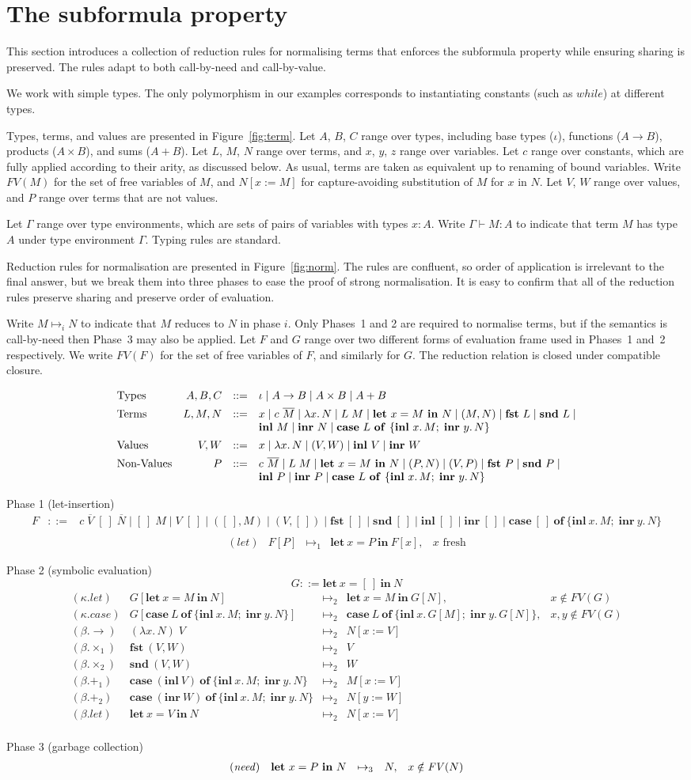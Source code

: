\documentclass[authoryear,9pt]{sigplanconf}
\makeatletter
\newcommand{\one}{\mathbf{1}}
\newcommand{\arrow}[2]{#1\rightarrow#2}
\newcommand{\product}[2]{#1\times#2}
\newcommand{\coproduct}[2]{#1+#2}
\newcommand{\key}{\mathbf}
\newcommand{\app}{\;}
\newcommand{\expvar}[1]{#1}
\newcommand{\expconst}[2]{#1~#2}
\newcommand{\expunit}{()}
\newcommand{\expabs}[3]{\lambda#1.\,#3}
\newcommand{\expapp}[2]{#1 \app #2}
\newcommand{\explet}[3]{\key{let}\ #1=#2\ \key{in}\ #3}
\newcommand{\exppair}[2]{(#1, #2)}
\newcommand{\expfst}[1]{\key{fst}~#1}
\newcommand{\expsnd}[1]{\key{snd}~#1}
\newcommand{\expinl}[2]{\key{inl}~#1}
\newcommand{\expinr}[2]{\key{inr}~#2}
\newcommand{\expcase}[5]
  {\key{case}\ #1\ \key{of}\ \{\key{inl}\ #2.\,#3;\; \key{inr}\ #4.\,#5\}}
\newcommand{\subst}[3]{#1[#2:=#3]}
\newcommand{\fv}[1]{\mathit{FV}(#1)}
\newcommand{\rewrite}[1]{\mathbin{\mapsto_{#1}}}
\newcommand{\hole}{[~]}
\newcommand{\intro}{\mathcal{I}}
\newcommand{\elim}{\mathcal{E}}
\newcommand{\inference}[3]{\infer[\mathsf{#2}]{#3}{#1}}
\newcommand{\figterm}{
\begin{figure*}[t]
\[
\begin{array}{l@{\quad}rcl}
\text{Types} & A,B,C & ::=&
  \iota           \mid
  \arrow{A}{B}    \mid
  \product{A}{B}  \mid
  \coproduct{A}{B}
\\[1ex]
\text{Terms} & L,M,N & ::= &
  \expvar{x}              	\mid
  \expconst{c}{\overline{M}}	\mid
  \expabs{x}{A}{N}              \mid
  \expapp{L}{M}                 \mid
  \explet{x}{M}{N}              \mid
  \exppair{M}{N}                \mid
  \expfst{L}                   	\mid
  \expsnd{L}                    \mid \\&&&
  \expinl{M}{\tm{B}}		\mid
  \expinr{\tm{A}}{N}           	\mid
  \expcase{L}{x}{M}{y}{N}
\\[1ex]
\text{Values} & V,W & ::= &
  \expvar{x}       \mid
  \expabs{x}{A}{N} \mid
  \exppair{V}{W}   \mid
  \expinl{V}{B}    \mid
  \expinr{A}{W}
\\[1ex]
\text{Non-Values} & P & ::= &
  \expconst{c}{\overline{M}}	\mid
  \expapp{L}{M}                 \mid
  \explet{x}{M}{N}              \mid
  \exppair{P}{N}                \mid
  \exppair{V}{P}                \mid
  \expfst{P}                   	\mid
  \expsnd{P}                    \mid \\&&&
  \expinl{P}{\tm{B}}		\mid
  \expinr{\tm{A}}{P}           	\mid
  \expcase{L}{x}{M}{y}{N}
\end{array}
\]

\caption{Types and Terms}
\label{fig:term}
\end{figure*}
}
\newcommand{\figtyping}{
\begin{figure*}[h]
\[
\begin{array}{@{}ll@{}}
\fbox{$\Gamma \vdash M:A$}
\\~\\
\inference
{x:A \in \Gamma}
{\mathbf{Ax}}
{
  \Gamma \vdash x:A
}
&
\inference
{}
{\one}
{
   \Gamma \vdash \expunit:\one
}
\\~\\
\inference
{
  \Gamma, x:A \vdash N:B
}
{{\to}\intro}
{
  \Gamma \vdash \expabs{x}{A}{N}:\arrow{A}{B}
}
&
\inference
{
  \Gamma \vdash L:\arrow{A}{B}
& \Gamma \vdash M:A
}
{{\to}\elim}
{
  \Gamma \vdash \expapp{L}{M}:B
}
\\~\\
\inference
{
  \Gamma \vdash M:A
  &
  \Gamma, x:A \vdash N:B
}
{\mathbf{let}}
{
  \Gamma \vdash \explet{x}{M}{N}:B
}
&
\inference
{
  \Gamma \vdash M:A
  &
  \Gamma \vdash N:B
}
{{\times}\intro}
{
  \Gamma \vdash \exppair{M}{N}:\product{A}{B}
}
\\~\\
\inference
{
  \Gamma \vdash L:\product{A}{B}
}
{{\times}\elim_1}
{
  \Gamma \vdash \expfst{L}:A
}
&
\inference
{
  \Gamma \vdash L:\product{A}{B}
}
{{\times}\elim_2}
{
  \Gamma \vdash \expsnd{L}:B
}
\\~\\
\inference
{
  \Gamma \vdash M:A
}
{{+}\intro_1}
{
  \Gamma \vdash \expinl{M}{B}:\coproduct{A}{B}
}
&
\inference
{
  \Gamma \vdash N:B
}
{{+}\intro_2}
{
  \Gamma \vdash \expinr{A}{N}:\coproduct{A}{B}
}
\\~\\
\inference
{
  \Gamma \vdash L:\coproduct{A}{B}
&
  \Gamma, x:A \vdash M:C
&
  \Gamma, y:B \vdash N:C
}
{{+}\elim}
{
  \Gamma \vdash \expcase{L}{x}{M}{y}{N}:C
}
\end{array}
\]
\caption{Typing Rules}
\label{fig:typing}
\end{figure*}
}
\newcommand{\fignf}{
\begin{figure*}[t]
\[
\begin{array}{l@{\quad}rcl}
\text{Neutral Forms}
  & Q & ::= & \expapp{x}{W}
         \mid \expconst{c}{\overline{W}}
         \mid \expapp{Q}{W}
         \mid \expfst{x}
         \mid \expsnd{x}
\\[1ex]
\text{Normal Values}
  & V,W & ::= & \expvar{x}
           \mid \expabs{x}{A}{N}
           \mid \exppair{V}{W}
           \mid \expinl{V}{B}
           \mid \expinr{A}{W}
\\[1ex]
\text{Normal Forms}
  & N,M & ::= & Q
          \mid  V
          \mid \expcase{z}{x}{N}{y}{M}
          \mid \explet{x}{Q}{N}
\\
\end{array}
\]
\caption{Normal Forms}
\label{fig:nf}
\end{figure*}
}
\newcommand{\fignorm}{
\begin{figure*}[t]
Phase 1 (let-insertion)
\[
  \begin{array}{lcl}
   F &\mathbin{::=}&
       c \app \overline{V} \app \hole \app \overline{N} \mid
       \expapp{\hole}{M}                                \mid
       \expapp{V}{\hole}                                \mid
       \exppair{\hole}{M}                               \mid
       \exppair{V}{\hole}                               \mid
       \expfst{\hole}                                   \mid
       \expsnd{\hole}                                   \mid %
       \expinl{\hole}{B}                                \mid
       \expinr{A}{\hole}                                \mid
       \expcase{\hole}{x}{M}{y}{N} \\
 \end{array}
\]%
\[
\begin{array}{lllll}
(\mathit{let})
& F[P]
& \rewrite{1}
& \explet{x}{P}{F[x]},
& x \text{ fresh}
\end{array}
\]

\vspace{2ex}

Phase 2 (symbolic evaluation)
\[
G \mathbin{::=}
    \explet{x}{\hole}{N}
\]
\[
\begin{array}{lllll}

(\kappa.{\mathit{let}})
& G[\explet{x}{M}{N}]
& \rewrite{2}
& \explet{x}{M}{G[N]},
& x \notin \fv{G} \\

(\kappa.{\mathit{case}})
& G[\expcase{L}{x}{M}{y}{N}]
& \rewrite{2}
& \expcase{L}{x}{G[M]}{y}{G[N]},
& x,y \notin \fv{G} \\


(\beta.{\rightarrow})
& \expapp{(\expabs{x}{A}{N})}{V}
& \rewrite{2}
& \subst{N}{x}{V} \\

(\beta.{\times_1})
& \expfst{\exppair{V}{W}}
& \rewrite{2}
& V \\

(\beta.{\times_2})
& \expsnd{\exppair{V}{W}}
& \rewrite{2}
& W \\

(\beta.{+_1})
& \expcase{(\expinl{V}{B})}{x}{M}{y}{N}
& \rewrite{2}
& \subst{M}{x}{V} \\

(\beta.{+_2})
& \expcase{(\expinr{A}{W})}{x}{M}{y}{N}
& \rewrite{2}
& \subst{N}{y}{W} \\

(\beta.{\mathit{let}})
& \explet{x}{V}{N}
& \rewrite{2}
& \subst{N}{x}{V} \\
\end{array}
\]

\vspace{2ex}

Phase 3 (garbage collection)
\[
\begin{array}[t]{@{}llll@{\quad}l@{}}

(\mathit{need})
& \explet{x}{P}{N}
& \rewrite{3}
& N,
& x \notin \fv{N}\\
\end{array}
\]

\caption{Normalisation Rules}
\label{fig:norm}
\end{figure*}
}
\makeatother
\begin{document}
\section{The subformula property}
\label{sec:subformula}

This section introduces a collection of reduction rules for
normalising terms that enforces the subformula property
while ensuring sharing is preserved. The rules adapt to
both call-by-need and call-by-value.

We work with simple types. The only polymorphism in our examples
corresponds to instantiating constants (such as $\mathit{while}$) at
different types.

Types, terms, and values are presented in Figure~\ref{fig:term}.
Let $A$, $B$, $C$ range over types, including base types ($\iota$),
functions ($A \to B$), products ($A \times B$), and sums ($A + B$).
Let $L$, $M$, $N$ range over terms, and $x$, $y$, $z$ range over
variables.  Let $c$ range over constants, which are fully
applied according to their arity, as discussed below.
As usual, terms are taken as
equivalent up to renaming of bound variables. Write $\fv{M}$ for
the set of free variables of $M$, and $\subst{N}{x}{M}$ for
capture-avoiding substitution of $M$ for $x$ in $N$.
Let $V$, $W$ range over values, and $P$ range over
terms that are not values.

Let $\Gamma$ range over type environments, which are sets of pairs
of variables with types $x:A$. Write $\Gamma \vdash M:A$ to
indicate that term $M$ has type $A$ under type environment
$\Gamma$. Typing rules are standard.

Reduction rules for normalisation are presented in Figure~\ref{fig:norm}.
The rules are confluent, so order of application is irrelevant to the
final answer, but we break them into three phases to ease the proof
of strong normalisation. It is easy to confirm that all
of the reduction rules preserve sharing and preserve order of evaluation.

Write $M \mapsto_i N$ to indicate that $M$ reduces to $N$ in phase
$i$. Only Phases~1 and 2 are required to normalise terms, but if the
semantics is call-by-need then Phase~3 may also be applied.
Let $F$ and $G$ range over two different forms of evaluation
frame used in Phases~1 and~2 respectively. We write $\fv{F}$ for the
set of free variables of $F$, and similarly for $G$.  The reduction
relation is closed under compatible closure.

\figterm
\fignorm
\end{document}
